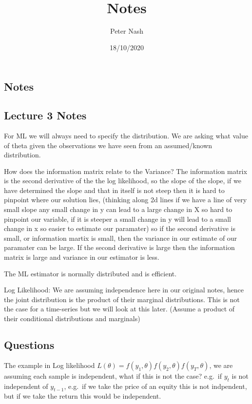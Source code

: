 \documentclass[]{article}
\title{Notes}
\author{Peter Nash}
\date{18/10/2020}
\begin{document}
\maketitle

\subsection{Notes}\label{notes}

\subsection{Lecture 3 Notes}\label{lecture-3-notes}

For ML we will always need to specify the distribution. We are asking
what value of theta given the observations we have seen from an
assumed/known distribution.

How does the information matrix relate to the Variance? The information
matrix is the second derivative of the the log likelihood, so the slope
of the slope, if we have determined the slope and that in itself is not
steep then it is hard to pinpoint where our solution lies, (thinking
along 2d lines if we have a line of very small slope any small change in
y can lead to a large change in X so hard to pinpoint our variable, if
it is steeper a small change in y will lead to a small change in x so
easier to estimate our paramater) so if the second derivative is small,
or information martix is small, then the variance in our estimate of our
paramater can be large. If the second derivative is large then the
information matrix is large and variance in our estimator is less.

The ML estimator is normally distributed and is efficient.

Log Likelihood: We are assuming independence here in our original notes,
hence the joint distribution is the product of their marginal
distributions. This is not the case for a time-series but we will look
at this later. (Assume a product of their conditional distributions and
marginals)

\subsection{Questions}\label{questions}

The example in Log likelihood
\(L(\theta) = f(y_1, \theta)f(y_2, \theta)f(y_T, \theta)\), we are
assuming each sample is independent, what if this is not the case?
e.g.~if \(y_t\) is not independent of \(y_{t-1}\), e.g.~if we take the
price of an equity this is not indpendent, but if we take the return
this would be independent.
\end{document}
